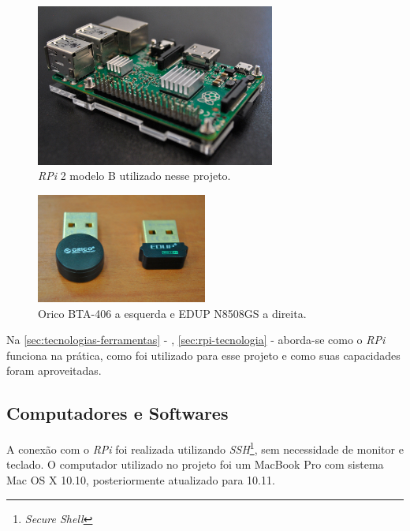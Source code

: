 \documentclass[
		12pt,				%
		openright,			%
		oneside,			%
		a4paper,			%
		chapter=TITLE,		%
		english,			%
		brazil				%
	]{abntex2}
\begin{document}
\begin{figure}[htb]
	\caption{\label{fig:rpi2-utilizado}\textit{RPi} 2 modelo B utilizado nesse projeto.}
	\begin{center}
		\includegraphics[width=0.7\textwidth]{img/rpi2.jpg}
	\end{center}
\end{figure}

\begin{figure}[htb]
	\caption{\label{fig:adaptadores}Orico BTA-406 a esquerda e EDUP N8508GS a direita.}
	\begin{center}
		\includegraphics[width=0.5\textwidth]{img/adaptadores.jpg}
	\end{center}
\end{figure}

Na \autoref{sec:tecnologias-ferramentas} - , \autoref{sec:rpi-tecnologia} -  aborda-se como o \textit{RPi} funciona na prática, como foi utilizado para esse projeto e como suas capacidades foram aproveitadas.

\subsection{Computadores e Softwares}\label{sec:comp-softwares}

A conexão com o \textit{RPi} foi realizada utilizando \textit{SSH}\footnote{\textit{Secure Shell}}, sem necessidade de monitor e teclado. O computador utilizado no projeto foi um MacBook Pro com sistema Mac OS X 10.10, posteriormente atualizado para 10.11. 
\end{document}
